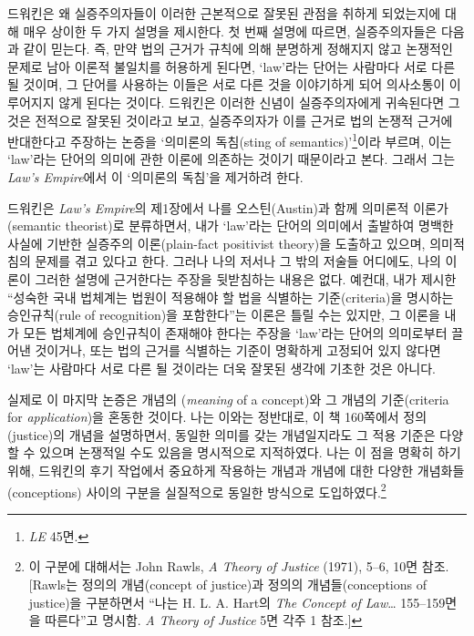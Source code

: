 드워킨은 왜 실증주의자들이 이러한 근본적으로 잘못된 관점을 취하게
되었는지에 대해 매우 상이한 두 가지 설명을 제시한다. 첫 번째 설명에
따르면, 실증주의자들은 다음과 같이 믿는다. 즉, 만약 법의 근거가 규칙에
의해 분명하게 정해지지 않고 논쟁적인 문제로 남아 이론적 불일치를
허용하게 된다면, `law'라는 단어는 사람마다 서로 다른  될 것이며, 그 단어를 사용하는 이들은 서로 다른 것을
이야기하게 되어 의사소통이 이루어지지 않게 된다는 것이다. 드워킨은
이러한 신념이 실증주의자에게 귀속된다면 그것은 전적으로 잘못된 것이라고
보고, 실증주의자가 이를 근거로 법의 논쟁적 근거에 반대한다고 주장하는
논증을 `의미론의 독침(sting of semantics)'\footnote{\emph{LE} 45면.}이라
부르며, 이는 `law'라는 단어의 의미에 관한 이론에 의존하는 것이기
때문이라고 본다. 그래서 그는 \emph{Law's Empire}에서 이 `의미론의
독침'을 제거하려 한다.

드워킨은 \emph{Law's Empire}의 제1장에서 나를 오스틴(Austin)과 함께
의미론적 이론가(semantic theorist)로 분류하면서, 내가 `law'라는 단어의
의미에서 출발하여 명백한 사실에 기반한 실증주의 이론(plain-fact
positivist theory)을 도출하고 있으며, 의미적 침의 문제를 겪고 있다고
한다. 그러나 나의 저서나 그 밖의 저술들 어디에도, 나의 이론이 그러한
설명에 근거한다는 주장을 뒷받침하는 내용은 없다. 예컨대, 내가 제시한
``성숙한 국내 법체계는 법원이 적용해야 할 법을 식별하는 기준(criteria)을
명시하는 승인규칙(rule of recognition)을 포함한다''는 이론은 틀릴 수는
있지만, 그 이론을 내가 모든 법체계에 승인규칙이 존재해야 한다는 주장을
`law'라는 단어의 의미로부터 끌어낸 것이거나, 또는 법의 근거를 식별하는
기준이 명확하게 고정되어 있지 않다면 `law'는 사람마다 서로 다른
 될 것이라는 더욱 잘못된 생각에 기초한 것은
아니다.

실제로 이 마지막 논증은 개념의 (\emph{meaning} of a
concept)와 그 개념의  기준(criteria for \emph{application})을
혼동한 것이다. 나는 이와는 정반대로, 이 책 160쪽에서 정의(justice)의
개념을 설명하면서, 동일한 의미를 갖는 개념일지라도 그 적용 기준은 다양할
수 있으며 논쟁적일 수도 있음을 명시적으로 지적하였다. 나는 이 점을
명확히 하기 위해, 드워킨의 후기 작업에서 중요하게 작용하는 개념과 개념에
대한 다양한 개념화들(conceptions) 사이의 구분을 실질적으로 동일한
방식으로 도입하였다.\footnote{이 구분에 대해서는 John Rawls, \emph{A
  Theory of Justice} (1971), 5--6, 10면 참조. {[}Rawls는 정의의
  개념(concept of justice)과 정의의 개념들(conceptions of justice)을
  구분하면서 ``나는 H. L. A. Hart의 \emph{The Concept of Law}\ldots{}
  155--159면을 따른다''고 명시함. \emph{A Theory of Justice} 5면 각주 1
  참조.{]}}

